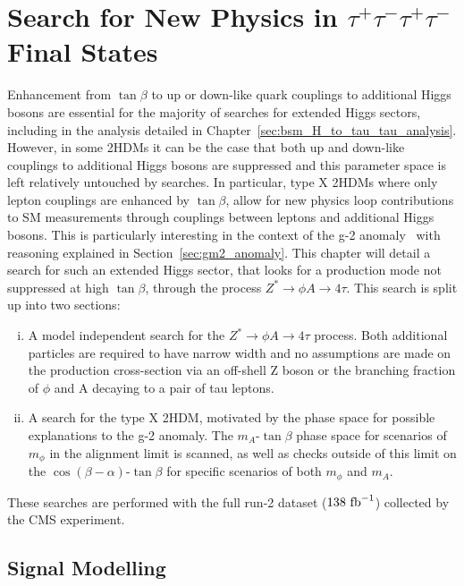 \chapter{\texorpdfstring{Search for New Physics in $\tau^+\tau^-\tau^+\tau^-$ Final States}{Search for new physics in tautautautau final states}}
\label{sec:H_A_to_4_tau_analysis}

Enhancement from $\tan\beta$ to up or down-like quark couplings to additional Higgs bosons are essential for the majority of searches for extended Higgs sectors, including in the analysis detailed in Chapter~\ref{sec:bsm_H_to_tau_tau_analysis}.
However, in some \ac{2HDM}s it can be the case that both up and down-like couplings to additional Higgs bosons are suppressed and this parameter space is left relatively untouched by  searches.
In particular, type X \ac{2HDM}s where only lepton couplings are enhanced by $\tan\beta$, allow for new physics loop contributions to \ac{SM} measurements through couplings between leptons and additional Higgs bosons.
This is particularly interesting in the context of the g-2 anomaly~\cite{Muong-2:2006rrc,Muong-2:2021ojo} with reasoning explained in Section~\ref{sec:gm2_anomaly}.
This chapter will detail a search for such an extended Higgs sector, that looks for a production mode not suppressed at high $\tan\beta$, through the process $Z^{*}\rightarrow \phi A \rightarrow 4\tau$.
This search is split up into two sections:

\begin{enumerate}[i)]
  \item A model independent search for the $Z^{*}\rightarrow \phi A \rightarrow 4\tau$ process. Both additional particles are required to have narrow width and no assumptions are made on the production cross-section via an off-shell Z boson or the branching fraction of $\phi$ and A decaying to a pair of tau leptons.
   \item A search for the type X \ac{2HDM}, motivated by the phase space for possible explanations to the g-2 anomaly. The $m_{A}$-$\tan\beta$ phase space for scenarios of $m_\phi$ in the alignment limit is scanned, as well as checks outside of this limit on the $\cos(\beta-\alpha)$-$\tan\beta$ for specific scenarios of both $m_\phi$ and $m_A$.
\end{enumerate}

These searches are performed with the full run-2 dataset ($138 \text{ fb}^{-1}$) collected by the \ac{CMS} experiment. 

\section{Signal Modelling}

